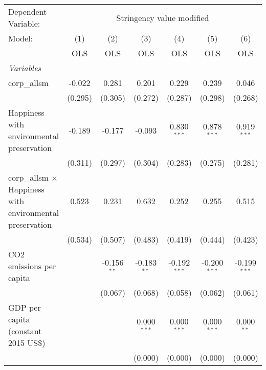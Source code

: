 
\begingroup
\centering
\begin{tabular}{lcccccc}
   \toprule
   Dependent Variable: & \multicolumn{6}{c}{Stringency value modified}\\
   Model:                                                           & (1)     & (2)           & (3)           & (4)            & (5)            & (6)\\  
                                                                    &  OLS    & OLS           & OLS           & OLS            & OLS            & OLS\\  
   \midrule
   \emph{Variables}\\
   corp\_allsm                                                      & -0.022  & 0.281         & 0.201         & 0.229          & 0.239          & 0.046\\   
                                                                    & (0.295) & (0.305)       & (0.272)       & (0.287)        & (0.298)        & (0.268)\\   
   Happiness with environmental preservation                        & -0.189  & -0.177        & -0.093        & 0.830$^{***}$  & 0.878$^{***}$  & 0.919$^{***}$\\   
                                                                    & (0.311) & (0.297)       & (0.304)       & (0.283)        & (0.275)        & (0.281)\\   
   corp\_allsm $\times$ Happiness with environmental preservation   & 0.523   & 0.231         & 0.632         & 0.252          & 0.255          & 0.515\\   
                                                                    & (0.534) & (0.507)       & (0.483)       & (0.419)        & (0.444)        & (0.423)\\   
   CO2 emissions per capita                                         &         & -0.156$^{**}$ & -0.183$^{**}$ & -0.192$^{***}$ & -0.200$^{***}$ & -0.199$^{***}$\\   
                                                                    &         & (0.067)       & (0.068)       & (0.058)        & (0.062)        & (0.061)\\   
   GDP per capita (constant 2015 US\$)                              &         &               & 0.000$^{***}$ & 0.000$^{***}$  & 0.000$^{***}$  & 0.000$^{**}$\\   
                                                                    &         &               & (0.000)       & (0.000)        & (0.000)        & (0.000)\\   

\end{tabular}
